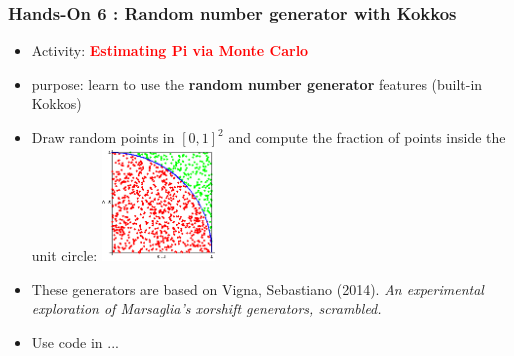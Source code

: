\begin{frame}[fragile=singleslide]
  \frametitle{Hands-On 6 : Random number generator with Kokkos}

  \begin{itemize}
  \item Activity: \textcolor{red}{\bf Estimating Pi via Monte Carlo}
  \item purpose: learn to use the {\bf random number generator} features (built-in Kokkos)
  \item Draw random points in $[0,1]^2$ and compute the fraction of points inside the unit circle:
    \includegraphics[width=3cm]{images/MonteCarloPiMod_gr_25}
  \item These generators are based on Vigna, Sebastiano (2014). {\it An experimental exploration of Marsaglia's xorshift generators, scrambled.} 
  \item Use code in ...
  \end{itemize}
  
\end{frame}